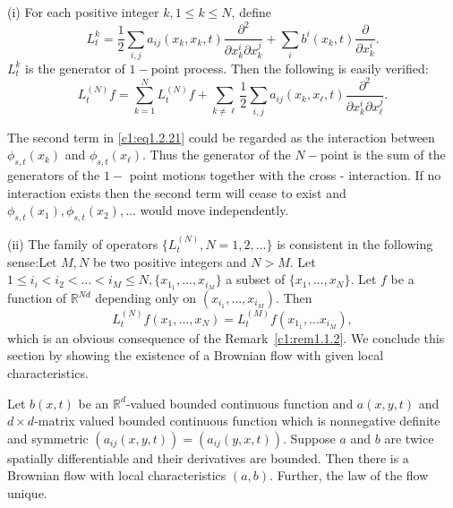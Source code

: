 \setcounter{remark}{6}
\begin{remark} %
(i) For each positive integer $k, 1 \le k \le N$, define
  \begin{equation*}
    L^k_t = \frac{1}{2} \sum_{i,j} a_{ij} (x_k,  x_k,t) \frac{\partial
      ^2}{\partial x^i_k \partial x^j_k} + \sum_i b^i(x_k,t)
    \frac{\partial}{\partial x^i_k}. \tag{1.2.20}\label{c1:eq1.2.20} 
  \end{equation*}
  $L^k_t$ is the generator of $1-$point process. Then the following is
  easily verified:  
  \begin{equation*} 
    L^{(N)}_t f = \sum^N_{k=1} L^{(N)}_t f + \sum_{k \neq \ell}
    \frac{1}{2} \sum_{i,j} a_{ij}(x_k,  x_\ell, t) \frac{\partial
      ^2}{\partial x^i_k \partial x^j_\ell}. \tag{1.2.21}\label{c1:eq1.2.21}  
\end{equation*}

The second term in \eqref{c1:eq1.2.21} could be regarded as the interaction
between $\phi_{s,t}(x_k)$ and $\phi_{s,t}(x_\ell)$. Thus the generator
of the $N-$point is the sum of the generators of the $1-$ point
motions together with the cross - interaction. If no interaction exists
then the second term will cease to exist and $\phi_{s,t}(x_1),
\phi_{s,t}(x_2), \ldots$ would move independently. 

(ii) The family of operators $\{ L^{(N)}_t,  N = 1,2, \ldots \}$ is
consistent in the following sense:\pageoriginale  Let $M, N$ be two positive
integers and $N > M$. Let $1\le i_i <i_2 < \ldots< i_M \le N,
\{x_{1_1},\ldots, x_{i_M}\}$ a subset of $\{x_1, \ldots,
x_N\}$. Let $f$ be a function of $\mathbb{R}^{Nd}$ depending only on
$(x_{i_1},\ldots, x_{i_M})$. Then  
\begin{equation*}
  L_t^{(N)} f(x_1, \ldots,x_N) = L_t^{(M)} f(x_{1{_1}},\ldots
  x_{i{_M}}), \tag{1.2.22}\label{c1:1.2.22} 
\end{equation*}
which is an obvious consequence of the Remark~\ref{c1:rem1.1.2}.
We conclude this section by showing the existence of a Brownian flow
with given local characteristics.  
\end{remark}


\setcounter{theorem}{7}
\begin{theorem}\label{c1:thm1.2.8}%
  Let $b(x,t)$ be an $\mathbb{R}^d$-valued bounded continuous function
  and $a (x,y,t)$ and $d \times d$-matrix valued bounded continuous
  function which is nonnegative definite and symmetric
  $(a_{ij}(x,y,t))=(a_{ij}(y,x,t))$. Suppose $a$ and $b$ are twice
  spatially differentiable and their derivatives are bounded. Then
  there is a Brownian flow with local characteristics
  $(a,b)$. Further, the law of the flow unique.  
\end{theorem}

